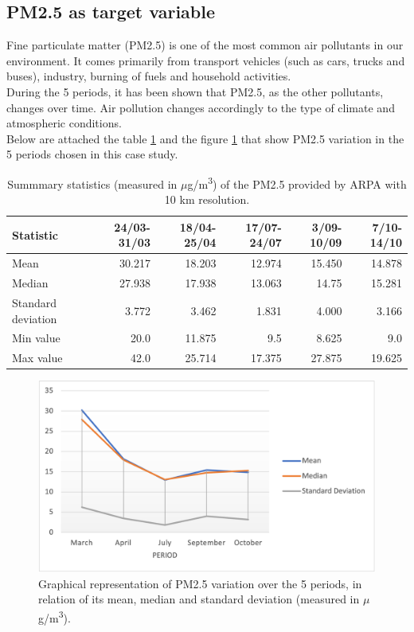 \subsection{PM2.5 as target variable}
Fine particulate matter (PM2.5) is one of the most common air pollutants in our environment. 
It comes primarily from transport vehicles (such as cars, trucks and buses), industry, burning of fuels and household activities. \\
During the 5 periods, it has been shown that PM2.5, as the other pollutants, changes over time. Air pollution changes accordingly to the type of climate and atmospheric conditions.\\
Below are attached the table \ref{tab:statspm25} and the figure \ref{fig:graphstatspm2.5} that show PM2.5 variation in the 5 periods chosen in this case study.
\begin{table}[H]
\centering
\begin{tabular}{lrrrrr}
\toprule
 Statistic &  24/03-31/03 &  18/04-25/04 &  17/07-24/07 &  3/09-10/09 &  7/10-14/10 \\
\midrule
  Mean  &        30.217  &         18.203  &         12.974 &       15.450 &       14.878 \\
Median  &        27.938 &        17.938 &        13.063 &       14.75 &       15.281 \\
 Standard deviation &        3.772 &        3.462 &        1.831 &       4.000 &       3.166 \\
  Min value &        20.0  &        11.875 &        9.5 &        8.625 &       9.0 \\
  Max value &        42.0 &        25.714 &        17.375 &        27.875 &       19.625 \\
\bottomrule
\end{tabular}
\caption{Summmary statistics (measured in $\mu$g/m\textsuperscript{3}) of the PM2.5 provided by ARPA with 10 km resolution.}
\label{tab:statspm25}
\end{table}
\begin{figure}[H]
    \centering
    \includegraphics[scale=0.8]{images/pm25_values.png}
    \caption{Graphical representation of PM2.5 variation over the 5 periods, in relation of its mean, median and standard deviation (measured in $\mu$g/m\textsuperscript{3}).}
    \label{fig:graphstatspm2.5}
\end{figure}
